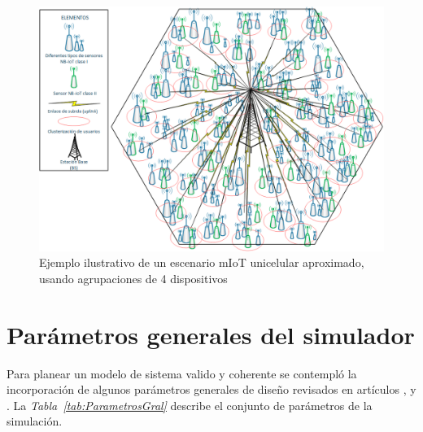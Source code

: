 \begin{figure}[th]
\centering
\includegraphics[scale=.65]{Figures/Escenario mIoT unicelda}
\decoRule
\caption[Ejemplo ilustrativo de un escenario mIoT unicelular aproximado, usando agrupaciones de 4 dispositivos]{Ejemplo ilustrativo de un escenario mIoT unicelular aproximado, usando agrupaciones de 4 dispositivos}
\label{fig:EscenarioMTC}
\end{figure}
\section{Parámetros generales del simulador}\label{parametrossimulador}

Para planear un modelo de sistema valido y coherente se contempló la incorporación de algunos parámetros generales de diseño revisados en artículos \parencite{Shahini2019}, \parencite{Mostafa2019} y \parencite{Gupta2018}. La \textit{Tabla~\ref{tab:ParametrosGral}} describe el conjunto de parámetros de la simulación.

